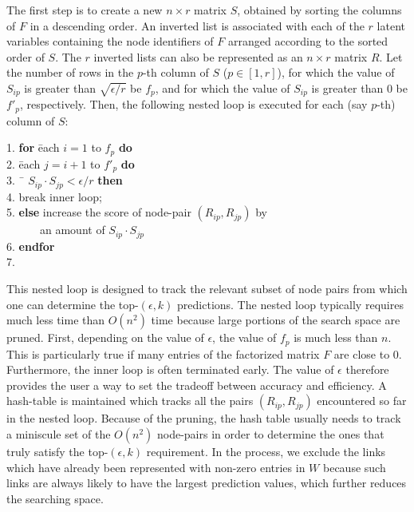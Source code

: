 The first step is to create a new $n \times r$ matrix $S$,
obtained by sorting the columns of $F$ in a descending order. An inverted list is
associated with each of the $r$ latent variables containing the node
identifiers  of $F$ arranged according to the sorted order of $S$. The
$r$ inverted lists can also be represented as an $n \times r$ matrix
$R$. Let the number of rows in the $p$-th column of $S$ ($p\in[1, r]$), for which
the value of $S_{ip}$ is greater than $\sqrt{\epsilon/r}$ be $f_p$, and for which the value of $S_{ip}$ is greater than 0 be $f'_p$, respectively.
%
Then, the following nested loop is executed for each (say $p$-th) column of $S$:

\begin{tabbing}1. \hspace{5ex}\=
{\bf for} \= each $i=1$ to $f_p$ {\bf do}\\
2. \> \= each $j=i+1$ to $f'_p$ {\bf do}\\
3. \>\>\ \= $S_{ip} \cdot S_{jp} < \epsilon/r$ {\bf then}\\
4. \>\>\>\>break inner loop; \\
5. \>\>\> {\bf else} increase the score of node-pair $(R_{ip}, R_{jp})$ by \\
   \>\>\> \ \ \ \ \ \ an amount of $S_{ip} \cdot S_{jp}$\\
6. \>\> {\bf endfor}\\
7. 
\end{tabbing}

This nested loop is designed to track the relevant subset of node
pairs from which one can determine the top-$(\epsilon, k)$
predictions.  The nested loop typically requires much less time than
$O(n^2)$ time because large portions of the search space are pruned.
First, depending on the value of $\epsilon$, the value of $f_p$ is
much less than $n$.  This is particularly true if many entries of
the factorized matrix $F$ are close to 0.  Furthermore, the inner
loop is often terminated early. The value of $\epsilon$ therefore
provides the user a way to set the tradeoff between accuracy and
efficiency. A hash-table is maintained which tracks all the pairs
$(R_{ip}, R_{jp})$ encountered so far in the nested loop. Because of
the pruning, the hash table usually needs to track a miniscule set
of the $O(n^2)$ node-pairs in order to determine the ones that truly satisfy the top-$(\epsilon, k)$ requirement. In the process, we exclude
the links which have already been represented with non-zero entries in $W$
because such links are always likely to have the largest prediction values,
which further reduces the searching space.

